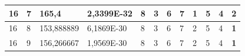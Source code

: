 \documentclass[conference]{IEEEtran}
\begin{document}
\begin{table}[]
\begin{tabular}{|llll|llllllll|}
\multicolumn{1}{|l|}{16}                                                    & \multicolumn{1}{l|}{7}                                                        & \multicolumn{1}{l|}{165,4}                                                        & 2,3399E-32                     & \multicolumn{1}{l|}{8}                                                  & \multicolumn{1}{l|}{3}                                                  & \multicolumn{1}{l|}{6}                                                  & \multicolumn{1}{l|}{7}                                                  & \multicolumn{1}{l|}{\textbf{1}}                                         & \multicolumn{1}{l|}{5}                                                  & \multicolumn{1}{l|}{4}                                                  & 2                          \\ \hline
\multicolumn{1}{|l|}{16}                                                    & \multicolumn{1}{l|}{8}                                                        & \multicolumn{1}{l|}{153,888889}                                                   & 6,1869E-30                     & \multicolumn{1}{l|}{8}                                                  & \multicolumn{1}{l|}{3}                                                  & \multicolumn{1}{l|}{6}                                                  & \multicolumn{1}{l|}{7}                                                  & \multicolumn{1}{l|}{2}                                                  & \multicolumn{1}{l|}{5}                                                  & \multicolumn{1}{l|}{4}                                                  & \textbf{1}                 \\ \hline
\multicolumn{1}{|l|}{16}                                                    & \multicolumn{1}{l|}{9}                                                        & \multicolumn{1}{l|}{156,266667}                                                   & 1,9569E-30                     & \multicolumn{1}{l|}{8}                                                  & \multicolumn{1}{l|}{3}                                                  & \multicolumn{1}{l|}{6}                                                  & \multicolumn{1}{l|}{7}                                                  & \multicolumn{1}{l|}{2}                                                  & \multicolumn{1}{l|}{5}                                                  & \multicolumn{1}{l|}{4}                                                  & \textbf{1}                 \\ \hline

\end{tabular}
\end{table}
\end{document}
